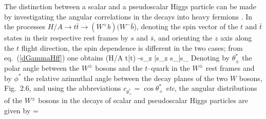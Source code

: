 The distinction between a scalar and a pseudoscalar Higgs particle can be made 
by investigating the angular
correlations in the decays into heavy fermions 
\cite{CPHff2,Bargeretal,CPHff1,CP-ee-HZChang,CP-H-Pois,CP-GunionGrz}.
In the processes $H/A \to t\bar{t} \to (W^+b)(W^-\bar{b}$), denoting the spin
vector of the $t$ and $\bar{t}$ states in their respective rest frames by $s$
and $\bar{s}$, and orienting the $z$ axis along the $t$ flight direction, the
spin dependence is different in the two cases; from eq.~(\ref{dGammaHff}) one
obtains \cite{Bargeretal}
\beq
\Gamma (H/A \to t\bar{t})  -s_z \bar{s}_z \pm s_\perp \bar{s}_\perp
\eeq
Denoting by $\theta^*_\pm$ the polar angle between the $W^\pm$ bosons and the  
$t$--quark in the $W^\pm$ rest frames and by $\phi^*$ the relative azimuthal 
angle between the decay planes of the two $W$ bosons, Fig.~2.6, and using the 
abbreviations $c_{\theta_+^*}=\cos\theta_+^*$ {\it etc}, the angular  
distributions of the $W^\pm$ bosons in the decays of scalar and  pseudoscalar 
Higgs particles are given by \cite{CPHff1,Kuhn-Wagner}
\beq
{}= 
\label{Httangular}
\eeq
\vspace*{-6mm}
